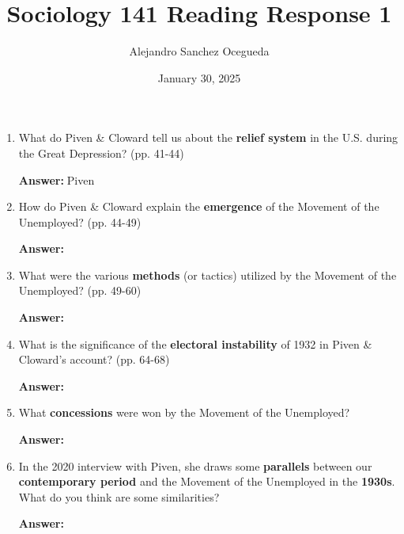 \documentclass{article}
\title{Sociology 141 Reading Response 1}
\author{Alejandro Sanchez Ocegueda}
\date{January 30, 2025}
\newcommand{\answer}{\textbf{Answer:}$\;$}
\begin{document}
\maketitle

\begin{enumerate}[label=\arabic*)]
    \item What do Piven \& Cloward tell us about the \textbf{relief system} in the U.S. during the Great Depression? (pp. 41-44)

    \answer Piven

    \item How do Piven \& Cloward explain the \textbf{emergence} of the Movement of the Unemployed? (pp. 44-49)

    \answer 

    \item What were the various \textbf{methods} (or tactics) utilized by the Movement of the Unemployed? (pp. 49-60)

    \answer

    \item What is the significance of the \textbf{electoral instability} of 1932 in Piven \& Cloward's account? (pp. 64-68)

    \answer

    \item What \textbf{concessions} were won by the Movement of the Unemployed?

    \answer

    \item In the 2020 interview with Piven, she draws some \textbf{parallels} between our \textbf{contemporary period} and the Movement of the Unemployed in the \textbf{1930s}.
    What do you think are some similarities?

    \answer
    
\end{enumerate}
 
\end{document}
